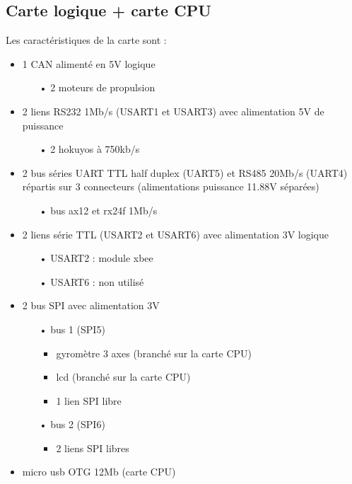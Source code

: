 \subsection{Carte logique + carte CPU}
Les caractéristiques de la carte sont :
\begin{itemize}
	\item 1 CAN alimenté en 5V logique
		\begin{itemize}
			\item[•] 2 moteurs de propulsion
		\end{itemize}
	\item 2 liens RS232 1Mb/s (USART1 et USART3) avec alimentation 5V de puissance
		\begin{itemize}
			\item[•] 2 hokuyos à 750kb/s
		\end{itemize}
	\item 2 bus séries UART TTL half duplex (UART5) et RS485 20Mb/s (UART4) répartis sur 3 connecteurs (alimentations puissance 11.88V séparées)
		\begin{itemize}
			\item[•] bus ax12 et rx24f 1Mb/s
		\end{itemize}
	\item 2 liens série TTL (USART2 et USART6) avec alimentation 3V logique
		\begin{itemize}
			\item[•] USART2 : module xbee
			\item[•] USART6 : non utilisé
		\end{itemize}
	\item 2 bus SPI avec alimentation 3V
		\begin{itemize}
			\item[•] bus 1 (SPI5)
				\begin{itemize}
					\item gyromètre 3 axes (branché sur la carte CPU)
					\item lcd (branché sur la carte CPU)
					\item 1 lien SPI libre
				\end{itemize}
			\item[•] bus 2 (SPI6)
				\begin{itemize}
					\item 2 liens SPI libres
				\end{itemize}
		\end{itemize}
	\item micro usb OTG 12Mb (carte CPU)
		\begin{itemize}

\end{itemize}
\end{itemize}

